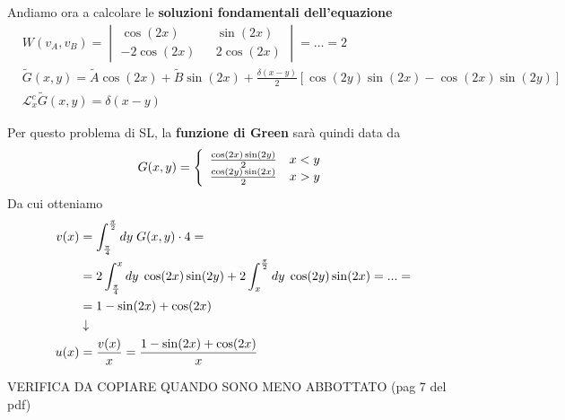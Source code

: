 Andiamo ora a calcolare le \textbf{soluzioni fondamentali dell'equazione}
\begin{align}
	&W(v_A,v_B) = \begin{vmatrix}
		\cos(2x) && \sin(2x)\\
		-2\cos(2x) && 2 \cos(2x)
	\end{vmatrix} = \dots = 2\\
	&\tilde{G}(x,y) = \tilde{A} \cos(2x) + \tilde{B} \sin(2x) + \frac{\delta (x-y)}{2} \left[ \cos(2y) \sin(2x) - \cos(2x) \sin(2y) \right]\\
	&\mathcal{L}_x^c \tilde{G}(x,y) = \delta (x-y)
\end{align}

Per questo problema di SL, la \textbf{funzione di Green} sarà quindi data da
\begin{align}
	G(x,y) = \left\{ \begin{array}{cc} \frac{\cos(2x) \sin(2y)}{2} \quad x<y\\ \frac{\cos(2y) \sin(2x)}{2} \quad x>y \end{array} \right.
\end{align}
Da cui otteniamo
\begin{align}
	v(x) &= \int_{\frac{\pi}{4}}^{\frac{\pi}{2}} dy \; G(x,y) \cdot 4 = \nonumber \\
	&= 2\int_{\frac{\pi}{4}}^{x} dy \;\cos(2x) \sin(2y)+ 2\int_{x}^{\frac{\pi}{2}} dy \; \cos(2y) \sin(2x) = ... = \nonumber\\
	&=1 - \sin(2x) + \cos(2x) \\ &\downarrow \nonumber \\
	u(x) &= \frac{v(x)}{x} = \frac{1 - \sin(2x) + \cos(2x)}{x}
\end{align}

\bigskip

VERIFICA DA COPIARE QUANDO SONO MENO ABBOTTATO (pag 7 del pdf)

\newpage

